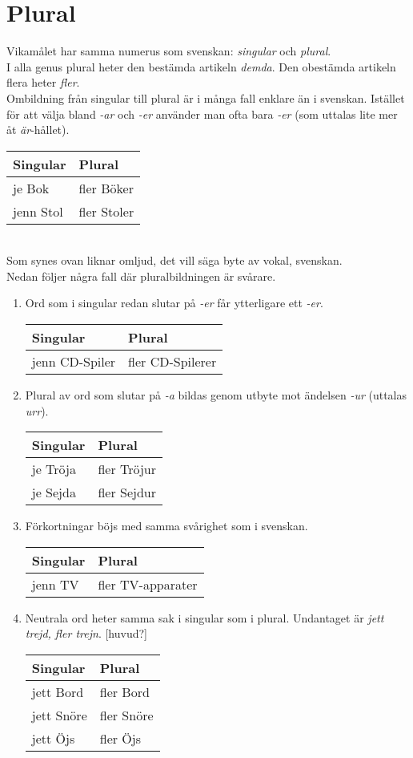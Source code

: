 \documentclass[a4paper]{memoir}
\newcommand{\eline}{\\[\baselineskip]} %
\newenvironment{mytable}[2]
{
  \eline
  \begin{tabular}{#1}
  \hline #2\\ \hline
}
{ \end{tabular} }
\newenvironment{wlistsipl} %
{ \begin{mytable}{ l l }{Singular & Plural} }
{ \end{mytable} }
\newenvironment{rlist} %
{ \begin{enumerate}[label=\Alph*] }
{ \end{enumerate} }
\begin{document}
  \chapter{Plural}
    Vikamålet har samma numerus som svenskan: \emph{singular} och \emph{plural}.\eline
    I alla genus plural heter den bestämda artikeln \emph{demda}. Den obestämda artikeln flera heter \emph{fler}.\eline
    Ombildning från singular till plural är i många fall enklare än i svenskan. Istället för att välja bland \emph{-ar} och \emph{-er} använder man ofta bara \emph{-er} (som uttalas lite mer åt \emph{är}-hållet).
    \begin{wlistsipl}
      je Bok & fler Böker \\
      jenn Stol & fler Stoler \\
    \end{wlistsipl}\eline
    Som synes ovan liknar omljud, det vill säga byte av vokal, svenskan.\eline
    Nedan följer några fall där pluralbildningen är svårare.
    \begin{rlist}
      \item Ord som i singular redan slutar på \emph{-er} får ytterligare ett \emph{-er}.
      \begin{wlistsipl}
        jenn CD-Spiler & fler CD-Spilerer\\
      \end{wlistsipl}
      \item Plural av ord som slutar på \emph{-a} bildas genom utbyte mot ändelsen \emph{-ur} (uttalas \emph{urr}).
      \begin{wlistsipl}
        je Tröja & fler Tröjur\\
        je Sejda & fler Sejdur\\
      \end{wlistsipl}
      \item Förkortningar böjs med samma svårighet som i svenskan.
      \begin{wlistsipl}
        jenn TV & fler TV-apparater
      \end{wlistsipl}
      \item Neutrala ord heter samma sak i singular som i plural. Undantaget är \emph{jett trejd, fler trejn}. [huvud?]
      \begin{wlistsipl}
        jett Bord & fler Bord\\
        jett Snöre & fler Snöre\\
        jett Öjs & fler Öjs\\
      \end{wlistsipl}
    \end{rlist}
\end{document}
